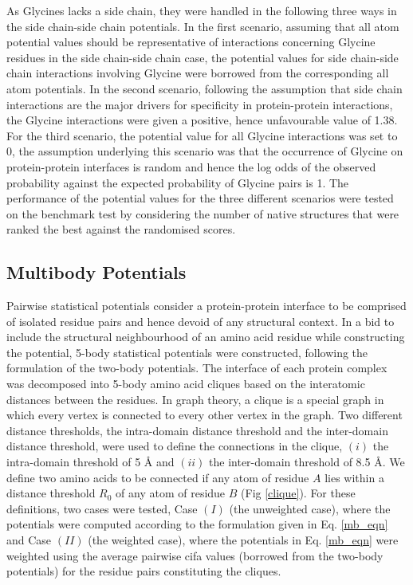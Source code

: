 \par
As Glycines lacks a side chain, they were handled in the following three ways in the side chain-side chain potentials. In the first scenario, assuming that all atom potential values should be representative of interactions concerning Glycine residues in the side chain-side chain case, the potential values for side chain-side chain interactions involving Glycine were borrowed from the corresponding all atom potentials. In the second scenario, following the assumption that side chain interactions are the major drivers for specificity in protein-protein interactions, the Glycine interactions were given a positive, hence unfavourable value of 1.38. For the third scenario, the potential value for all Glycine interactions was set to 0, the assumption underlying this scenario was that the occurrence of Glycine on protein-protein interfaces is random and hence the log odds of the observed probability against the expected probability of Glycine pairs is 1. The performance of the potential values for the three different scenarios were tested on the benchmark test by considering the number of native structures that were ranked the best against the randomised scores.

\vfill

\subsection{Multibody Potentials}
Pairwise statistical potentials consider a protein-protein interface to be comprised of isolated residue pairs and hence devoid of any structural context. In a bid to include the structural neighbourhood of an amino acid residue while constructing the potential, 5-body statistical potentials were constructed, following the formulation of the two-body potentials. The interface of each protein complex was decomposed into 5-body amino acid cliques based on the interatomic distances between the residues. In graph  theory, a clique is a special graph in which every vertex is connected to every other vertex in the graph. Two different distance thresholds, the intra-domain distance threshold and the inter-domain distance threshold, were used to define the connections in the clique, $(i)$ the intra-domain threshold of 5 \AA \; and $(ii)$ the inter-domain threshold of 8.5 \AA. We define two amino acids to be connected if any atom of residue $A$ lies within a distance threshold $R_0$ of any atom of residue $B$ (Fig \ref{clique}). 
For these definitions, two cases were tested, Case $(I)$ (the unweighted case), where the potentials were computed according to the formulation given in Eq. \ref{mb_eqn} and Case $(II)$ (the weighted case), where the potentials in Eq. \ref{mb_eqn} were weighted using the average pairwise cifa values (borrowed from the two-body potentials) for the residue pairs constituting the cliques.
\vspace{36pt}


